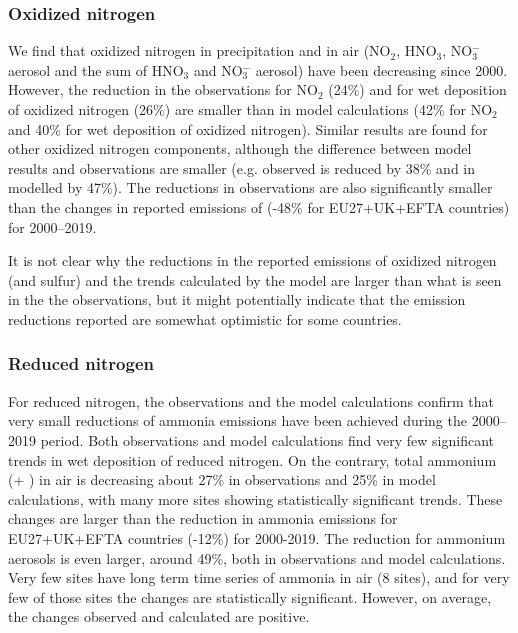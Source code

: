 \subsubsection*{Oxidized nitrogen}
We find that oxidized nitrogen in precipitation and in air (NO$_2$, HNO$_3$, NO$_3^{-}$ aerosol and the sum of HNO$_3$ and NO$_3^{-}$ aerosol) have been decreasing since 2000. However, the reduction in the observations 
for NO$_2$ (24\%) and for wet deposition of oxidized nitrogen (26\%) %
are smaller than in model calculations (42\%
for NO$_2$ and 40\% 
for wet deposition of oxidized nitrogen). Similar results are found for other oxidized nitrogen components, although the difference between model results and observations are smaller (e.g. observed \noiii is reduced by 38\% and in modelled by 47\%). The reductions in observations
are also significantly smaller than the changes in reported emissions of \noii (-48\% for EU27+UK+EFTA countries) for 2000--2019.

It is not clear why the reductions in the reported emissions of oxidized nitrogen (and sulfur) and the trends calculated by the model are larger than what is seen in the the observations, but it might potentially indicate that the emission reductions reported are somewhat optimistic for some countries.

\subsubsection*{Reduced nitrogen}
For reduced nitrogen, the observations and the model calculations confirm that very small reductions of ammonia emissions have been achieved during the 2000--2019 period. 
Both observations and model calculations find very few significant trends in wet deposition of reduced nitrogen.
On the contrary, total ammonium (\nhiii + \nhiv) in air is decreasing about 27\% in observations and 25\% in model calculations, with many more sites showing statistically significant trends.
These changes are larger than the reduction in ammonia emissions for EU27+UK+EFTA countries (-12\%)
for 2000-2019. The reduction for ammonium aerosols is even larger, around 49\%, 
both in observations and model calculations. Very few sites have long term time series of ammonia in air (8 sites), and for very few of those sites the changes are statistically significant. However, on average, the changes observed and calculated are positive. 

